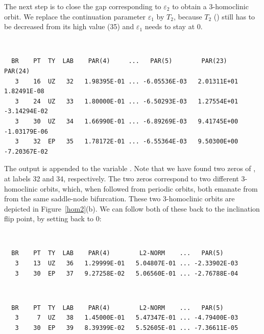 \documentclass[12pt]{report}
\begin{document}
The next step is to close the gap corresponding to $\varepsilon_2$ to
obtain a 3-homoclinic orbit. We replace the continuation parameter
$\varepsilon_1$ by $T_2$, because $T_2$ ()
still has to be decreased from
its high value (35) and $\varepsilon_1$ needs to stay at 0.
\begin{center}
\\
\end{center} 
\begin{verbatim}
  BR    PT  TY  LAB    PAR(4)     ...   PAR(5)        PAR(23)       PAR(24)
   3    16  UZ   32   1.98395E-01 ... -6.05536E-03   2.01311E+01   1.82491E-08
   3    24  UZ   33   1.80000E-01 ... -6.50293E-03   1.27554E+01  -3.14294E-02
   3    30  UZ   34   1.66990E-01 ... -6.89269E-03   9.41745E+00  -1.03179E-06
   3    32  EP   35   1.78172E-01 ... -6.55364E-03   9.50300E+00  -7.20367E-02
\end{verbatim}
The output is appended to the \python variable .
Note that we have found two zeros of , at labels 32 and
34, respectively. The two zeros
correspond to two different 3-homoclinic
orbits, which, when followed from periodic orbits, both emanate from
from the same saddle-node bifurcation.
These two 3-homoclinic orbits are depicted in Figure~\ref{hom2}(b).
We can follow both of these back to the inclination flip point, by
setting  back to 0:
\begin{center}
\\
\end{center} 
\begin{verbatim}
  BR    PT  TY  LAB    PAR(4)        L2-NORM    ...   PAR(5)     
   3    13  UZ   36   1.29999E-01   5.04807E-01 ... -2.33902E-03
   3    30  EP   37   9.27258E-02   5.06560E-01 ... -2.76788E-04
\end{verbatim}
\begin{center}
 \\
\end{center}
\begin{verbatim}
  BR    PT  TY  LAB    PAR(4)        L2-NORM    ...   PAR(5)     
   3     7  UZ   38   1.45000E-01   5.47347E-01 ... -4.79400E-03
   3    30  EP   39   8.39399E-02   5.52605E-01 ... -7.36611E-05
\end{verbatim}
\end{document}
